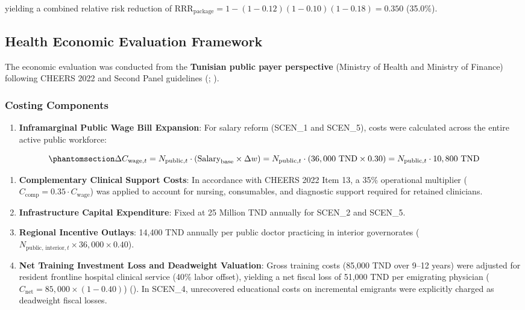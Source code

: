 \documentclass[
  11pt,
  a4paper]{article}
\providecommand{\tightlist}{%
  \setlength{\itemsep}{0pt}\setlength{\parskip}{0pt}}
\begin{document}
yielding a combined relative risk reduction of
\(\text{RRR}_{\text{package}} = 1 - (1 - 0.12)(1 - 0.10)(1 - 0.18) = 0.350\)
(35.0\%).

\subsection{Health Economic Evaluation
Framework}\label{sec-methods-economics}

The economic evaluation was conducted from the \textbf{Tunisian public
payer perspective} (Ministry of Health and Ministry of Finance)
following CHEERS 2022 and Second Panel guidelines
(;
).

\subsubsection{Costing Components}\label{costing-components}

\begin{enumerate}
\def\labelenumi{\arabic{enumi}.}
\tightlist
\item
  \textbf{Inframarginal Public Wage Bill Expansion}: For salary reform
  (SCEN\_1 and SCEN\_5), costs were calculated across the entire active
  public workforce:
\end{enumerate}

\begin{equation}\protect\phantomsection\label{eq-wage-cost}{\Delta C_{\text{wage}, t} = N_{\text{public}, t} \cdot (\text{Salary}_{\text{base}} \times \Delta w) = N_{\text{public}, t} \cdot (36,000\text{ TND} \times 0.30) = N_{\text{public}, t} \cdot 10,800\text{ TND}}\end{equation}

\begin{enumerate}
\def\labelenumi{\arabic{enumi}.}
\setcounter{enumi}{1}
\tightlist
\item
  \textbf{Complementary Clinical Support Costs}: In accordance with
  CHEERS 2022 Item 13, a 35\% operational multiplier
  (\(C_{\text{comp}} = 0.35 \cdot C_{\text{wage}}\)) was applied to
  account for nursing, consumables, and diagnostic support required for
  retained clinicians.
\item
  \textbf{Infrastructure Capital Expenditure}: Fixed at 25 Million TND
  annually for SCEN\_2 and SCEN\_5.
\item
  \textbf{Regional Incentive Outlays}: 14,400 TND annually per public
  doctor practicing in interior governorates
  (\(N_{\text{public, interior}, t} \times 36,000 \times 0.40\)).
\item
  \textbf{Net Training Investment Loss and Deadweight Valuation}: Gross
  training costs (85,000 TND over 9--12 years) were adjusted for
  resident frontline hospital clinical service (40\% labor offset),
  yielding a net fiscal loss of 51,000 TND per emigrating physician
  (\(C_{\text{net}} = 85,000 \times (1 - 0.40)\))
  (). In SCEN\_4,
  unrecovered educational costs on incremental emigrants were explicitly
  charged as deadweight fiscal losses.
\end{enumerate}
\end{document}
